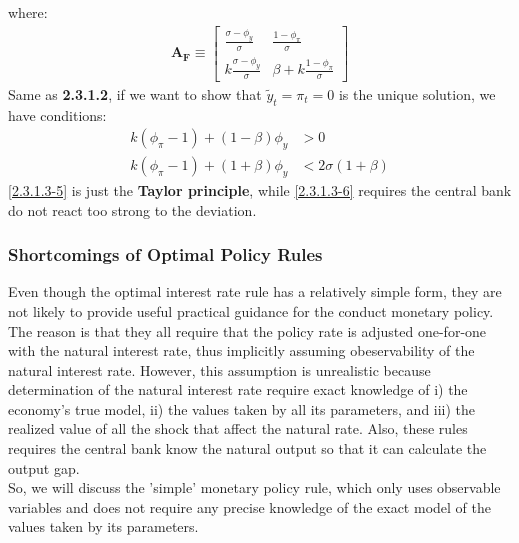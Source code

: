 \documentclass{article}
\numberwithin{equation}{section}
\begin{document}
where:
	\begin{align*}
		\boldsymbol{A_F} \equiv
		\begin{bmatrix}
			\frac{\sigma - \phi_y}{\sigma} & \frac{1 - \phi_\pi}{\sigma}\\
			k\frac{\sigma - \phi_y}{\sigma} & \beta + k\frac{1 - \phi_\pi}{\sigma}
		\end{bmatrix}
	\end{align*}
Same as \textbf{2.3.1.2}, if we want to show that $\tilde{y}_t = \pi_t = 0$ is the unique solution, we have conditions:
	\begin{align}
		k(\phi_\pi - 1) + (1 - \beta)\phi_y &> 0 \label{2.3.1.3-5}\\
		k(\phi_\pi - 1) + (1 + \beta)\phi_y &< 2\sigma(1 + \beta) \label{2.3.1.3-6}
	\end{align}
\eqref{2.3.1.3-5} is just the \textbf{Taylor principle}, while \eqref{2.3.1.3-6} requires  the central bank do not react too strong to the deviation.

\subsubsection{Shortcomings of Optimal Policy Rules}
Even though the optimal interest rate rule has a relatively simple form, they are not likely to provide useful practical guidance for the conduct monetary policy.\\
The reason is that they all require that the policy rate is adjusted one-for-one with the natural interest rate, thus implicitly assuming obeservability of the natural interest rate. However, this assumption is unrealistic because determination of the natural interest rate require exact knowledge of i) the economy's true model, ii) the values taken by all its parameters, and iii) the realized value of all the shock that affect the natural rate. Also, these rules requires the central bank know the natural output so that it can calculate the output gap.\\
So, we will discuss the 'simple' monetary policy rule, which only uses observable variables and does not require any precise knowledge of the exact model of the values taken by its parameters.
\end{document}
